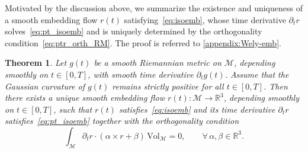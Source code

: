 \documentclass[11pt,a4paper,oneside,reqno]{amsart}
\theoremstyle{definition}
\theoremstyle{plain}
\newtheorem{theorem}{Theorem}
\numberwithin{theorem}{section}
\numberwithin{proposition}{section}
\numberwithin{lemma}{section}
\numberwithin{equation}{section}
\newcommand{\Man}{\mathcal{M}}
\newcommand{\Vol}{\mathrm{Vol}}
\begin{document}
Motivated by the discussion above, we summarize the existence and uniqueness of a smooth embedding flow \(r(t)\) satisfying~\eqref{eq:isoemb}, whose time derivative \(\partial_t r\) solves~\eqref{eq:pt_isoemb} and is uniquely determined by the orthogonality condition~\eqref{eq:ptr_orth_RM}. The proof is referred to \ref{appendix:Wely-emb}.
\begin{theorem}\label{thm:wely-emb}
Let \(g(t)\) be a smooth Riemannian metric on \(\Man\), depending smoothly on \(t\in[0,T]\), with smooth time derivative \(\partial_t g(t)\).
Assume that the Gaussian curvature of \(g(t)\) remains strictly positive for all \(t\in[0,T]\).
Then there exists a {unique} smooth embedding flow \(r(t):\Man\to\mathbb{R}^3\), depending smoothly on \(t\in[0,T]\), such that \(r(t)\) satisfies~\eqref{eq:isoemb} and its time derivative \(\partial_t r\) satisfies~\eqref{eq:pt_isoemb} together with the orthogonality condition
\begin{equation}\label{eq:ptr_orth_RM}
\int_{\Man} \partial_t r \cdot (\alpha \times r + \beta)\,\Vol_{\Man} = 0,
\qquad \forall\, \alpha,\beta \in \mathbb{R}^3.
\end{equation}
\end{theorem}
\end{document}
